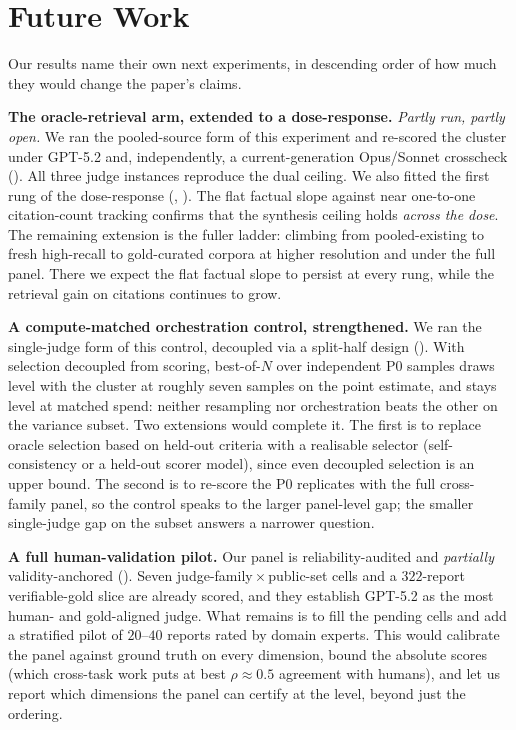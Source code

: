 \documentclass[11pt]{article}
\begin{document}
\section{Future Work}\label{sec:future}
Our results name their own next experiments, in descending order of how much they would
change the paper's claims.

\textbf{The oracle-retrieval arm, extended to a dose-response.} \emph{Partly run, partly open.} We ran the pooled-source form of
this experiment and re-scored the cluster under GPT-5.2 and, independently, a current-generation
Opus/Sonnet crosscheck (). All three judge instances reproduce the dual ceiling.
We also fitted the first rung of the dose-response
(, ). The flat factual slope against near one-to-one
citation-count tracking confirms that the synthesis ceiling holds \emph{across the
dose}. The remaining extension is the fuller ladder: climbing from
pooled-existing to fresh high-recall to gold-curated corpora at higher resolution and under the
full panel. There we expect the flat factual slope to persist at every rung, while the retrieval
gain on citations continues to grow.

\textbf{A compute-matched orchestration control, strengthened.} We ran the single-judge form
of this control, decoupled via a split-half design (). With selection decoupled from
scoring, best-of-$N$ over independent P0 samples draws level with the cluster at roughly seven
samples on the point estimate, and stays level at matched spend: neither resampling nor
orchestration beats the other on the variance subset. Two extensions would complete it. The first is to replace
oracle selection based on held-out criteria with a realisable selector (self-consistency or a held-out
scorer model), since even decoupled selection is an upper bound. The second is to re-score the
P0 replicates with the full cross-family panel, so the control speaks to the larger
panel-level gap; the smaller single-judge gap on the subset answers a narrower question.

\textbf{A full human-validation pilot.} Our panel is
reliability-audited and \emph{partially} validity-anchored (). Seven
judge-family\,$\times$\,public-set cells and a $322$-report verifiable-gold slice are already
scored, and they establish GPT-5.2 as the most human- and gold-aligned judge. What remains is to
fill the pending cells and add a stratified pilot of $20$--$40$ reports rated by domain
experts. This would calibrate the panel against ground truth on every dimension, bound the
absolute scores (which cross-task work puts at best $\rho\approx0.5$ agreement with humans), and
let us report which dimensions the panel can certify at the level, beyond just the ordering.
\end{document}

